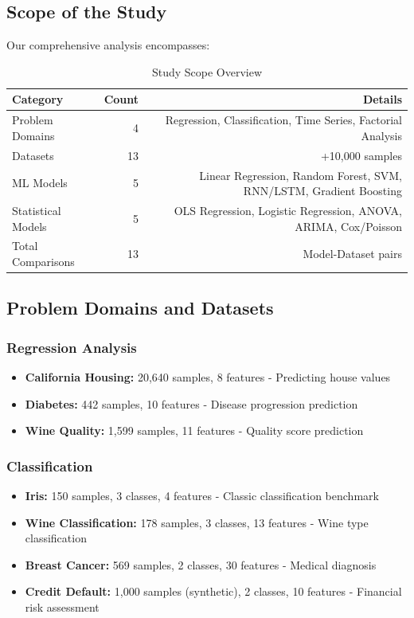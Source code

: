 \documentclass[11pt,a4paper]{article}
\begin{document}
\subsection{Scope of the Study}

Our comprehensive analysis encompasses:

\begin{table}[h]
\centering
\begin{tabular}{lrr}
\toprule
\textbf{Category} & \textbf{Count} & \textbf{Details} \\
\midrule
Problem Domains & 4 & Regression, Classification, Time Series, Factorial Analysis \\
Datasets & 13 & +10,000 samples \\
ML Models & 5 & Linear Regression, Random Forest, SVM, RNN/LSTM, Gradient Boosting \\
Statistical Models & 5 & OLS Regression, Logistic Regression, ANOVA, ARIMA, Cox/Poisson \\
Total Comparisons & 13 & Model-Dataset pairs \\
\bottomrule
\end{tabular}
\caption{Study Scope Overview}
\label{tab:scope}
\end{table}

\subsection{Problem Domains and Datasets}

\subsubsection{Regression Analysis}
\begin{itemize}
    \item \textbf{California Housing:} 20,640 samples, 8 features - Predicting house values
    \item \textbf{Diabetes:} 442 samples, 10 features - Disease progression prediction
    \item \textbf{Wine Quality:} 1,599 samples, 11 features - Quality score prediction
\end{itemize}

\subsubsection{Classification}
\begin{itemize}
    \item \textbf{Iris:} 150 samples, 3 classes, 4 features - Classic classification benchmark
    \item \textbf{Wine Classification:} 178 samples, 3 classes, 13 features - Wine type classification
    \item \textbf{Breast Cancer:} 569 samples, 2 classes, 30 features - Medical diagnosis
    \item \textbf{Credit Default:} 1,000 samples (synthetic), 2 classes, 10 features - Financial risk assessment
\end{itemize}
\end{document}
